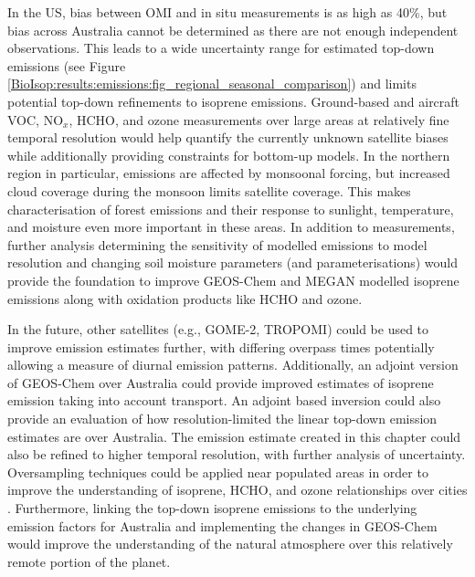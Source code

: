 \documentclass[acp, manuscript]{copernicus}
\newcommand{\parencite}{\citep}
\begin{document}
  In the US, bias between OMI and in situ measurements is as high as 40\%, but 
  bias across Australia cannot be determined as there are not enough independent observations.
  This leads to a wide uncertainty range for estimated top-down emissions (see Figure \ref{BioIsop:results:emissions:fig_regional_seasonal_comparison}) and limits potential top-down refinements to isoprene emissions.
  Ground-based and aircraft VOC, NO$_x$, HCHO, and ozone measurements over large areas at relatively fine temporal resolution would help quantify the currently unknown satellite biases while additionally providing constraints for bottom-up models.
  In the northern region in particular, emissions are affected by monsoonal forcing, but increased cloud coverage during the monsoon limits satellite coverage. 
  This makes characterisation of forest emissions and their response to sunlight, temperature, and moisture even more important in these areas.
  In addition to measurements, further analysis determining the sensitivity of modelled emissions to model resolution and changing soil moisture parameters (and parameterisations) would provide the foundation to improve GEOS-Chem and MEGAN modelled isoprene emissions along with oxidation products like HCHO and ozone.
  
  In the future, other satellites (e.g., GOME-2, TROPOMI) could be used to improve emission estimates further, with differing overpass times potentially allowing a measure of diurnal emission patterns.
  Additionally, an adjoint version of GEOS-Chem over Australia could provide improved estimates of isoprene emission taking into account transport.
  An adjoint based inversion could also provide an evaluation of how resolution-limited the linear top-down emission estimates are over Australia.
  The emission estimate created in this chapter could also be refined to higher temporal resolution, with further analysis of uncertainty.
  Oversampling techniques could be applied near populated areas in order to improve the understanding of isoprene, HCHO, and ozone relationships over cities \parencite[e.g.,][]{Surl2018}.
  Furthermore, linking the top-down isoprene emissions to the underlying emission factors for Australia and implementing the changes in GEOS-Chem would improve the understanding of the natural atmosphere over this relatively remote portion of the planet. %
\end{document}

